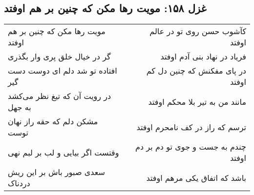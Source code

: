 \begin{center}
\section*{غزل ۱۵۸: مویت رها مکن که چنین بر هم اوفتد}
\label{sec:158}
\begin{longtable}{l p{0.5cm} r}
مویت رها مکن که چنین بر هم اوفتد
&&
کآشوب حسن روی تو در عالم اوفتد
\\
گر در خیال خلق پری وار بگذری
&&
فریاد در نهاد بنی آدم اوفتد
\\
افتاده تو شد دلم ای دوست دست گیر
&&
در پای مفکنش که چنین دل کم اوفتد
\\
در رویت آن که تیغ نظر می‌کشد به جهل
&&
مانند من به تیر بلا محکم اوفتد
\\
مشکن دلم که حقه راز نهان توست
&&
ترسم که راز در کف نامحرم اوفتد
\\
وقتست اگر بیایی و لب بر لبم نهی
&&
چندم به جست و جوی تو دم بر دم اوفتد
\\
سعدی صبور باش بر این ریش دردناک
&&
باشد که اتفاق یکی مرهم اوفتد
\\
\end{longtable}
\end{center}
